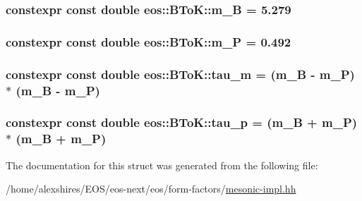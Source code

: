 \label{structeos_1_1BToK_ac78a6940a67216f7ef20e348776e850c}
\hypertarget{structeos_1_1BToK_afd952438871e130473abfe28556b6287}{
\subsubsection[{m\_\-B}]{\setlength{\rightskip}{0pt plus 5cm}constexpr const double {\bf eos::BToK::m\_\-B} = 5.279}}
\label{structeos_1_1BToK_afd952438871e130473abfe28556b6287}
\hypertarget{structeos_1_1BToK_aed69f6a47bf87622584136fd30a2c4ec}{
\subsubsection[{m\_\-P}]{\setlength{\rightskip}{0pt plus 5cm}constexpr const double {\bf eos::BToK::m\_\-P} = 0.492}}
\label{structeos_1_1BToK_aed69f6a47bf87622584136fd30a2c4ec}
\hypertarget{structeos_1_1BToK_a1e903e338534718baea7cf0f62cb4355}{
\subsubsection[{tau\_\-m}]{\setlength{\rightskip}{0pt plus 5cm}constexpr const double {\bf eos::BToK::tau\_\-m} = ({\bf m\_\-B} -\/ {\bf m\_\-P}) $\ast$ ({\bf m\_\-B} -\/ {\bf m\_\-P})}}
\label{structeos_1_1BToK_a1e903e338534718baea7cf0f62cb4355}
\hypertarget{structeos_1_1BToK_a3f1976d7598992bd31888637a55a6cf4}{
\subsubsection[{tau\_\-p}]{\setlength{\rightskip}{0pt plus 5cm}constexpr const double {\bf eos::BToK::tau\_\-p} = ({\bf m\_\-B} + {\bf m\_\-P}) $\ast$ ({\bf m\_\-B} + {\bf m\_\-P})}}
\label{structeos_1_1BToK_a3f1976d7598992bd31888637a55a6cf4}


The documentation for this struct was generated from the following file:\begin{DoxyCompactItemize}
\item 
/home/alexshires/EOS/eos-\/next/eos/form-\/factors/\hyperlink{mesonic-impl_8hh}{mesonic-\/impl.hh}\end{DoxyCompactItemize}
